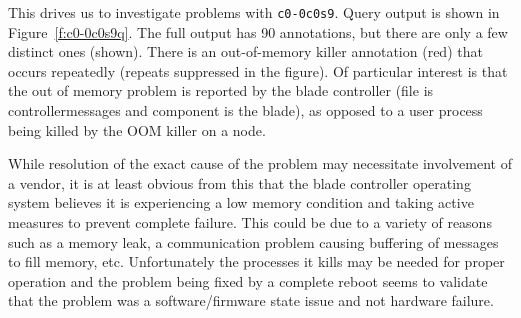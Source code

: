 This drives us to investigate problems with \texttt{c0-0c0s9}. Query output is shown in Figure~\ref{f:c0-0c0s9q}. The full output has 90 annotations, but there
are only a few distinct ones (shown). There is an out-of-memory killer annotation (red) that occurs repeatedly (repeats suppressed in the figure). Of particular interest is that the
out of memory problem is reported by the blade controller (file is controllermessages and component is the blade), as opposed to a user process being killed by
the OOM killer on a node.

While resolution of the exact cause of the problem may necessitate involvement of a vendor, it is at least obvious from this that the blade controller operating system believes it is experiencing a low memory condition and taking active measures to prevent complete failure. This could be due to a variety of reasons such as a memory leak, a communication problem causing buffering of messages to fill memory, etc. Unfortunately the processes it kills may be needed for proper operation and the problem being fixed by a complete reboot seems to validate that the problem was a software/firmware state issue and not hardware failure.

